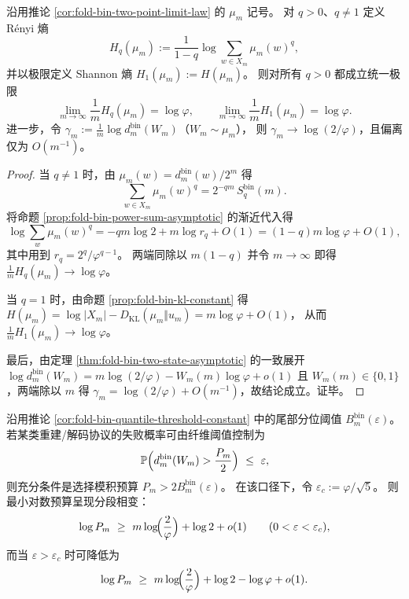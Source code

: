 \begin{theorem}\label{thm:fold-bin-renyi-rate-collapse}
沿用推论 \ref{cor:fold-bin-two-point-limit-law} 的 \(\mu_m\) 记号。
对 \(q>0\)、\(q\neq 1\) 定义 R\'enyi 熵
\[
H_q(\mu_m):=\frac{1}{1-q}\log\sum_{w\in X_m}\mu_m(w)^q,
\]
并以极限定义 Shannon 熵 \(H_1(\mu_m):=H(\mu_m)\)。
则对所有 \(q>0\) 都成立统一极限
\[
\lim_{m\to\infty}\frac{1}{m}H_q(\mu_m)=\log\varphi,
\qquad
\lim_{m\to\infty}\frac{1}{m}H_1(\mu_m)=\log\varphi.
\]
进一步，令
\(
\gamma_m:=\frac{1}{m}\log d^{\mathrm{bin}}_m(W_m)
\)（\(W_m\sim\mu_m\)），
则 \(\gamma_m\to\log(2/\varphi)\)，且偏离仅为 \(O(m^{-1})\)。
\end{theorem}

\begin{proof}
当 \(q\neq 1\) 时，由 \(\mu_m(w)=d^{\mathrm{bin}}_m(w)/2^m\) 得
\[
\sum_{w\in X_m}\mu_m(w)^q
=2^{-qm}\,S_q^{\mathrm{bin}}(m).
\]
将命题 \ref{prop:fold-bin-power-sum-asymptotic} 的渐近代入得
\[
\log\sum_{w}\mu_m(w)^q
=-qm\log 2 + m\log r_q + O(1)
=(1-q)m\log\varphi+O(1),
\]
其中用到 \(r_q=2^q/\varphi^{q-1}\)。
两端同除以 \(m(1-q)\) 并令 \(m\to\infty\) 即得 \(\frac{1}{m}H_q(\mu_m)\to\log\varphi\)。
\par
当 \(q=1\) 时，由命题 \ref{prop:fold-bin-kl-constant} 得
\(
H(\mu_m)=\log|X_m|-D_{\mathrm{KL}}(\mu_m\Vert u_m)
=m\log\varphi+O(1)
\)，
从而 \(\frac{1}{m}H_1(\mu_m)\to\log\varphi\)。
\par
最后，由定理 \ref{thm:fold-bin-two-state-asymptotic} 的一致展开
\(
\log d^{\mathrm{bin}}_m(W_m)=m\log(2/\varphi)-W_m(m)\log\varphi+o(1)
\)
且 \(W_m(m)\in\{0,1\}\)，两端除以 \(m\) 得
\(
\gamma_m=\log(2/\varphi)+O(m^{-1})
\)，故结论成立。证毕。
\end{proof}



\begin{corollary}[重建预算的相变：阈值 \texorpdfstring{$\varepsilon_c=\varphi/\sqrt5$}{epsc=phi/sqrt5} 处出现 \texorpdfstring{$\log\varphi$}{log phi} 级节省]\label{cor:fold-bin-budget-phase-transition}
沿用推论 \ref{cor:fold-bin-quantile-threshold-constant} 中的尾部分位阈值 \(B^{\mathrm{bin}}_m(\varepsilon)\)。
若某类重建/解码协议的失败概率可由纤维阈值控制为
\[
\mathbb{P}\Bigl(d^{\mathrm{bin}}_m(W_m)>\frac{P_m}{2}\Bigr)\ \le\ \varepsilon,
\]
则充分条件是选择模积预算 \(P_m>2B^{\mathrm{bin}}_m(\varepsilon)\)。
在该口径下，令 \(\varepsilon_c:=\varphi/\sqrt5\)。
则最小对数预算呈现分段相变：
\[
\log P_m\ \ge\ m\log\!\Bigl(\frac{2}{\varphi}\Bigr)+\log 2+o(1)\qquad(0<\varepsilon<\varepsilon_c),
\]
而当 \(\varepsilon>\varepsilon_c\) 时可降低为
\[
\log P_m\ \ge\ m\log\!\Bigl(\frac{2}{\varphi}\Bigr)+\log 2-\log\varphi+o(1).
\]
\end{corollary}

